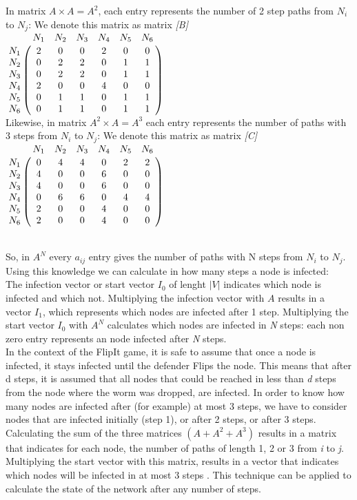 In matrix $A \times A = A^{2}$, each entry represents the number of 2 step paths from $N_{i}$ to $N_{j}$: We denote this matrix as matrix \textit{[B]}\\


$
\bordermatrix{
         & N_1		& N_2	& N_3	& N_4 	& N_5	&N_6     \cr
    N_1   & 2		& 0		& 0		& 2		& 0		& 0	     \cr
    N_2   & 0		& 2		& 2		& 0		& 1		& 1	     \cr
    N_3   & 0		& 2		& 2		& 0		& 1		& 1	     \cr
    N_4   & 2		& 0		& 0		& 4		& 0		& 0	     \cr
	N_5   & 0		& 1		& 1		& 0		& 1		& 1	     \cr
	N_6   & 0		& 1		& 1		& 0		& 1		& 1	     \cr
}$
\\

Likewise, in matrix $A^{2} \times A = A^{3}$ each entry represents the number of paths with 3 steps from $N_{i}$ to $N_{j}$: We denote this matrix as matrix \textit{[C]}\\


$
\bordermatrix{
         & N_1		& N_2	& N_3	& N_4 	& N_5	&N_6     \cr
    N_1   & 0		& 4		& 4		& 0		& 2		& 2	     \cr
    N_2   & 4		& 0		& 0		& 6		& 0		& 0	     \cr
    N_3   & 4		& 0		& 0		& 6		& 0		& 0	     \cr
    N_4   & 0		& 6		& 6		& 0		& 4		& 4	     \cr
	N_5   & 2		& 0		& 0		& 4		& 0		& 0	     \cr
	N_6   & 2		& 0		& 0		& 4		& 0		& 0	     \cr
}$ 


~~\\
So, in $A^{N}$ every $a_{ij}$ entry gives the number of paths with N steps from $N_{i}$ to $N_{j}$.\\

Using this knowledge we can calculate in how many steps a node is infected: \\
The infection vector or start vector $I_{0}$ of lenght $|V|$ indicates which node is infected and which not. Multiplying the infection vector with $A$ results in a vector $I_{1}$, which represents which nodes are infected after 1 step. Multiplying the start vector $I_{0}$ with $A^{N}$ calculates which nodes are infected in \textit{N} steps: each non zero entry represents an node infected after \textit{N} steps. \\
In the context of the FlipIt game, it is safe to assume that once a node is infected, it stays infected until the defender Flips the node. This means that after d steps, it is assumed that all nodes that could be reached in less than \textit{d} steps from the node where the worm was dropped, are infected. In order to know how many nodes are infected after (for example) at most 3 steps, we have to consider nodes that are infected initially (step 1), or after 2 steps, or after 3 steps.  Calculating the sum of the three matrices $(A + A^{2} + A^{3}) $ results in a matrix that indicates for each node, the number of paths of length 1, 2 or 3 from \textit{i} to \textit{ j}. Multiplying the start vector with this matrix, results in a vector that indicates which nodes will be infected in at most 3 steps . This technique can be applied to calculate the state of the network after any number of steps. \\

